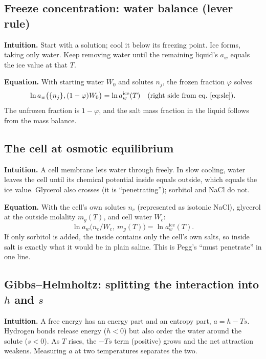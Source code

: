 \documentclass[11pt,a4paper]{article}
\begin{document}
\subsection{Freeze concentration: water balance (lever rule)}
\textbf{Intuition.} Start with a solution; cool it below its freezing point. Ice forms, taking only water. Keep
removing water until the remaining liquid's $a_w$ equals the ice value at that $T$.

\textbf{Equation.} With starting water $W_0$ and solutes $n_j$, the frozen fraction $\varphi$ solves
\begin{equation}
\ln a_w\big(\{n_j\},(1-\varphi)W_0\big)=\ln a_w^{\mathrm{ice}}(T)\quad\text{(right side from eq.~\ref{eq:sle})}.
\label{eq:balance}
\end{equation}
The unfrozen fraction is $1-\varphi$, and the salt mass fraction in the liquid follows from the mass balance.

\subsection{The cell at osmotic equilibrium}
\textbf{Intuition.} A cell membrane lets water through freely. In slow cooling, water leaves the cell until its
chemical potential inside equals outside, which equals the ice value. Glycerol also crosses (it is
``penetrating''); sorbitol and NaCl do not.

\textbf{Equation.} With the cell's own solutes $n_c$ (represented as isotonic NaCl), glycerol at the outside molality
$m_g(T)$, and cell water $W_c$:
\begin{equation}
\ln a_w\big(n_c/W_c,\ m_g(T)\big)=\ln a_w^{\mathrm{ice}}(T).
\label{eq:cell}
\end{equation}
If only sorbitol is added, the inside contains only the cell's own salts, so inside salt is exactly what it would be
in plain saline. This is Pegg's ``must penetrate'' \cite{pegg} in one line.

\subsection{Gibbs--Helmholtz: splitting the interaction into $h$ and $s$}
\textbf{Intuition.} A free energy has an energy part and an entropy part, $a=h-Ts$. Hydrogen bonds release energy
($h<0$) but also order the water around the solute ($s<0$). As $T$ rises, the $-Ts$ term (positive) grows and the net
attraction weakens. Measuring $a$ at two temperatures separates the two.
\end{document}
